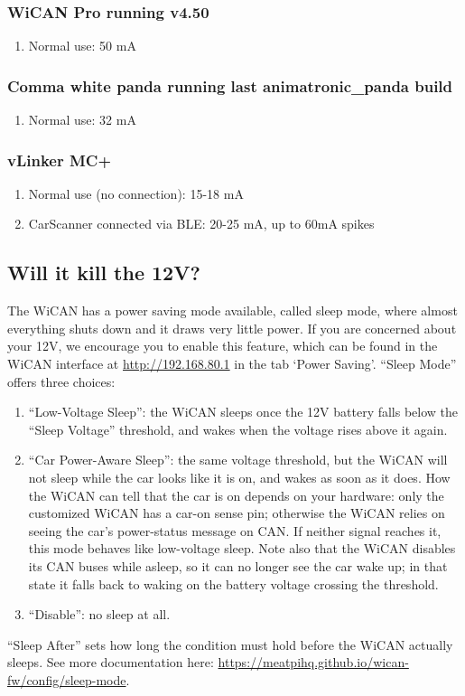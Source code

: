 \documentclass[superscriptaddress,onecolumn,floatfix]{revtex4-2}
\begin{document}
\subsubsection{WiCAN Pro running v4.50}
\begin{enumerate}
  \item{Normal use:} 50 mA
\end{enumerate}

\subsubsection{Comma white panda running last animatronic\_panda build}
\begin{enumerate}
  \item{Normal use:} 32 mA
\end{enumerate}

\subsubsection{vLinker MC+}
\begin{enumerate}
  \item{Normal use (no connection):} 15-18 mA
  \item{CarScanner connected via BLE:} 20-25 mA, up to 60mA spikes
\end{enumerate}

\subsection{Will it kill the 12V?}

The WiCAN has a power saving mode available, called sleep mode, where almost everything shuts down and it draws very little power. If you are concerned about your 12V, we encourage you to enable this feature, which can be found in the WiCAN interface at \href{http://192.168.80.1}{http://192.168.80.1} in the tab `Power Saving'. ``Sleep Mode'' offers three choices:
\begin{enumerate}
  \item ``Low-Voltage Sleep'': the WiCAN sleeps once the 12V battery falls below the ``Sleep Voltage'' threshold, and wakes when the voltage rises above it again.
  \item ``Car Power-Aware Sleep'': the same voltage threshold, but the WiCAN will not sleep while the car looks like it is on, and wakes as soon as it does. How the WiCAN can tell that the car is on depends on your hardware: only the customized WiCAN has a car-on sense pin; otherwise the WiCAN relies on seeing the car's power-status message on CAN. If neither signal reaches it, this mode behaves like low-voltage sleep. Note also that the WiCAN disables its CAN buses while asleep, so it can no longer see the car wake up; in that state it falls back to waking on the battery voltage crossing the threshold.
  \item ``Disable'': no sleep at all.
\end{enumerate}
``Sleep After'' sets how long the condition must hold before the WiCAN actually sleeps. See more documentation here: \href{https://meatpihq.github.io/wican-fw/config/sleep-mode}{https://meatpihq.github.io/wican-fw/config/sleep-mode}.
\end{document}
